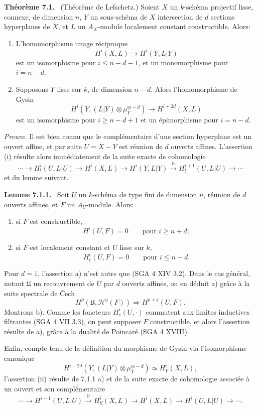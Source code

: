 \documentclass[11pt]{article}
\newenvironment{statement}[1]{\par\medskip\noindent\textbf{#1.}\ }{\par\medskip}
\begin{document}
\begin{statement}{Théorème 7.1}
(Théorème de Lefschetz.) Soient $X$ un $k$-schéma projectif lisse, connexe, de dimension $n$, $Y$ un sous-schéma de $X$ intersection de $d$ sections hyperplanes de $X$, et $L$ un $A_X$-module localement constant constructible. Alors:
\begin{enumerate}[label=(\roman*)]
\item L'homomorphisme image réciproque
\[
H^i(X,L)\to H^i(Y,L|Y)
\]
est un isomorphisme pour $i\le n-d-1$, et un monomorphisme pour $i=n-d$.
\item Supposons $Y$ lisse sur $k$, de dimension $n-d$. Alors l'homomorphisme de Gysin
\[
H^i(Y,(L|Y)\otimes\mu_Y^{\otimes -d})\to H^{i+2d}(X,L)
\]
est un isomorphisme pour $i\ge n-d+1$ et un épimorphisme pour $i=n-d$.
\end{enumerate}
\end{statement}

\emph{Preuve.} Il est bien connu que le complémentaire d'une section hyperplane est un ouvert affine, et par suite $U=X-Y$ est réunion de $d$ ouverts affines. L'assertion (i) résulte alors immédiatement de la suite exacte de cohomologie
\[
\cdots\to H_!^i(U,L|U)\to H^i(X,L)\to H^i(Y,L|Y)
\xrightarrow{\partial} H_!^{i+1}(U,L|U)\to\cdots
\]
et du lemme suivant.

\begin{statement}{Lemme 7.1.1}
Soit $U$ un $k$-schéma de type fini de dimension $n$, réunion de $d$ ouverts affines, et $F$ un $A_U$-module. Alors:
\begin{enumerate}[label=\alph*)]
\item si $F$ est constructible,
\[
H^i(U,F)=0\qquad\text{pour }i\ge n+d;
\]
\item si $F$ est localement constant et $U$ lisse sur $k$,
\[
H^i_c(U,F)=0\qquad\text{pour }i\le n-d.
\]
\end{enumerate}
\end{statement}

Pour $d=1$, l'assertion a) n'est autre que (SGA 4 XIV 3.2). Dans le cas général, notant $\mathfrak U$ un recouvrement de $U$ par $d$ ouverts affines, on en déduit a) grâce à la suite spectrale de Čech
\[
H^p(\mathfrak U,\mathcal H^q(F))\Rightarrow H^{p+q}(U,F).
\]
Montrons b). Comme les foncteurs $H_c^i(U,\cdot)$ commutent aux limites inductives filtrantes (SGA 4 VII 3.3), on peut supposer $F$ constructible, et alors l'assertion résulte de a), grâce à la dualité de Poincaré (SGA 4 XVIII).

Enfin, compte tenu de la définition du morphisme de Gysin via l'isomorphisme canonique
\[
H^{i-2d}(Y,(L|Y)\otimes\mu_Y^{\otimes -d})\simeq H^i_Y(X,L),
\tag{7.1.2}
\]
l'assertion (ii) résulte de 7.1.1 a) et de la suite exacte de cohomologie associée à un ouvert et son complémentaire
\[
\cdots\to H^{i-1}(U,L|U)\xrightarrow{\partial}H^i_Y(X,L)\to H^i(X,L)\to H^i(U,L|U)\to\cdots .
\]
\end{document}
